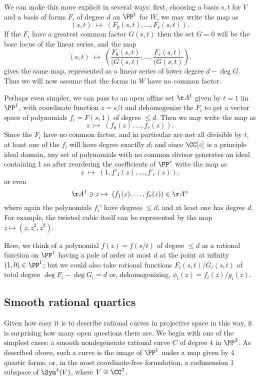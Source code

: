 We can make this more explicit in several ways: first, choosing a basis $s,t$ for $V$ and a basis of forms $F_i$ of degree $d$ on $\PP^1$ for $W$, we may write the map as
$$
(s,t) \; \mapsto \; (F_0(s,t), \dots, F_r(s,t)).
$$
If the $F_i$ have a greatest common factor $G(s,t)$ then the set $G=0$ will be the base locus
of the linear series, and the map
$$
(s,t) \; \mapsto \; ( \frac{F_0(s,t)}{(G(s,t)}, \dots, \frac{F_r(s,t)}{(G(s,t)}).
$$
gives the same map, represented as a linear series of lower degree $d-\deg G$. Thus we
will now assume that the forms in $W$ have no common factor.

Perhaps even simpler, we can pass to an open affine set $\AA^1$ given by $t=1$ iin $\PP^1$, with coordinate function $z = s/t$ and
dehomogenize the $F_i$ to get a vector space of polynomials $f_i = F(s,1)$ of degree $\leq d$. Then we may write the
map as
$$
z \; \mapsto \; (f_0(z), \dots, f_r(z)).
$$
Since the $F_i$ have no common factor, and in particular are not all divisible by $t$, at least one of the
$f_i$ will have degree exactlly $d$; and since $\CC[z]$ is a principle ideal domain, any set of 
polynomials with no common divisor generates an ideal containing 
1 so after reordering the coefficients of $\PP^r$ write the map as
$$
z \; \mapsto \; (1, f'_1(z), \dots, f'_r(z)).
$$
or even
$$
\AA^1 \ni z \mapsto \; (f_1(z), \dots, f_r(z))\in \AA^n
$$
where again the polynomials $f_i'$ have degrees $\leq d$, and at least one has degree $d$.
For example, the twisted cubic itself can be represented by the map
$z \mapsto (z,z^2,z^3)$.

Here, we think of a polynomial $f(z) = f(s/t)$ of degree $\leq d$ as a rational function on $\PP^1$ having
a pole of order at most $d$ at the point at infinity $(1,0)\in \PP^1$; but we could also take rational
functions $F_i(s,t)/G_i(s,t)$ of total degree $\deg F_i-\deg G_i = d$ or, dehomogenizing, $\phi_i(z) = f_i(z)/g_i(z)$.

\subsection *{Smooth rational quartics}
Given how easy it is to describe rational curves in projective space in this way, it is surprising how many open questions there are. We begin with
one of the simplest cases: a smooth nondegenerate rational curve $C$ of degree $4$ in $\PP^3$.
As described above, such a curve is the image of $\PP^1$ under a map given by 4 quartic forms,
or, in the most coordinate-free formulation, a codimension 1 subspace of $\Sym^4(V)$, where
$V\cong \CC^2$. 

